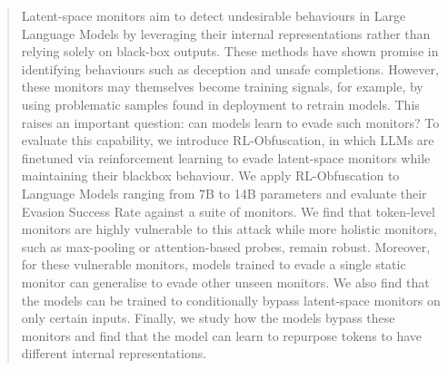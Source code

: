 
\vspace{-8pt}
\begin{abstract}
Latent-space monitors aim to detect undesirable behaviours in Large Language Models by leveraging their internal representations rather than relying solely on black-box outputs. These methods have shown promise in identifying behaviours such as deception and unsafe completions. However, these monitors may themselves become training signals, for example, by using problematic samples found in deployment to retrain models. This raises an important question: can models learn to evade such monitors? To evaluate this capability, we introduce RL-Obfuscation, in which LLMs are finetuned via reinforcement learning to evade latent-space monitors while maintaining their blackbox behaviour. We apply RL-Obfuscation to Language Models ranging from 7B to 14B parameters and evaluate their Evasion Success Rate against a suite of monitors. We find that token-level monitors are highly vulnerable to this attack while more holistic monitors, such as max-pooling or attention-based probes, remain robust. Moreover, for these vulnerable monitors, models trained to evade a single static monitor can generalise to evade other unseen monitors. We also find that the models can be trained to conditionally bypass latent-space monitors on only certain inputs. Finally, we study how the models bypass these monitors and find that the model can learn to repurpose tokens to have different internal representations. 
\end{abstract}
\vspace{4pt}
